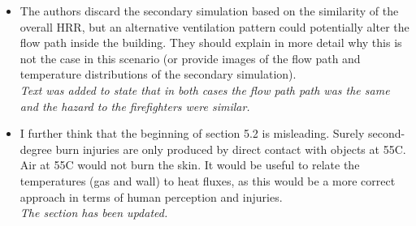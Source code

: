 \documentclass[12pt]{article}
\begin{document}
\begin{itemize}
\item The authors discard the secondary simulation based on the similarity of the overall HRR, but an alternative ventilation pattern could potentially alter the flow path inside the building. They should explain in more detail why this is not the case in this scenario (or provide images of the flow path and temperature distributions of the secondary simulation). \\
{\it Text was added to state that in both cases the flow path path was the same and the hazard to the firefighters were similar.}
\item I further think that the beginning of section 5.2 is misleading. Surely second-degree burn injuries are only produced by direct contact with objects at 55C. Air at 55C would not burn the skin. It would be useful to relate the temperatures (gas and wall) to heat fluxes, as this would be a more correct approach in terms of human perception and injuries. \\
{\it The section has been updated.}
\end{itemize}
\end{document}
